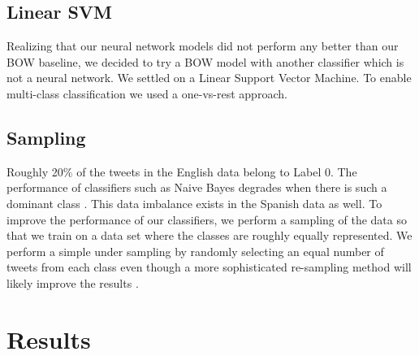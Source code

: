 \documentclass[11pt,a4paper]{article}
\begin{document}
\subsection{Linear SVM}
Realizing that our neural network models did not perform any better than our BOW baseline, we decided to try a BOW model with another classifier which is not a neural network. We settled on a Linear Support Vector Machine. To enable multi-class classification we used a one-vs-rest approach. 

\subsection{Sampling}
Roughly 20\% of the tweets in the English data belong to Label 0. The performance of classifiers such as Naive Bayes degrades when there is such a dominant class \cite{Rennie03}. This data imbalance exists in the Spanish data as well. To improve the performance of our classifiers, we perform a sampling of the data so that we train on a data set where the classes are roughly equally represented. We perform a simple under sampling by randomly selecting an equal number of tweets from each class even though a more sophisticated re-sampling method will likely improve the results \cite{Estabrooks:Resampling}. 


\section{Results}
\end{document}
